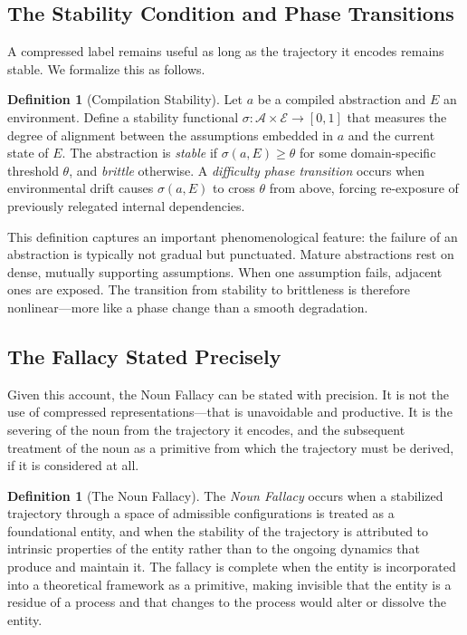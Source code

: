 \documentclass[12pt, a4paper]{article}
\theoremstyle{plain}
\theoremstyle{definition}
\newtheorem{definition}[theorem]{Definition}
\theoremstyle{remark}
\begin{document}
\subsection{The Stability Condition and Phase Transitions}

A compressed label remains useful as long as the trajectory it encodes
remains stable. We formalize this as follows.

\begin{definition}[Compilation Stability]
Let $a$ be a compiled abstraction and $E$ an environment. Define a stability
functional $\sigma: \mathcal{A} \times \mathcal{E} \to [0,1]$ that measures
the degree of alignment between the assumptions embedded in $a$ and the current
state of $E$. The abstraction is \emph{stable} if $\sigma(a,E) \geq \theta$
for some domain-specific threshold $\theta$, and \emph{brittle} otherwise.
A \emph{difficulty phase transition} occurs when environmental drift causes
$\sigma(a,E)$ to cross $\theta$ from above, forcing re-exposure of previously
relegated internal dependencies.
\end{definition}

This definition captures an important phenomenological feature: the failure
of an abstraction is typically not gradual but punctuated. Mature abstractions
rest on dense, mutually supporting assumptions. When one assumption fails,
adjacent ones are exposed. The transition from stability to brittleness is
therefore nonlinear---more like a phase change than a smooth degradation.

\subsection{The Fallacy Stated Precisely}

Given this account, the Noun Fallacy can be stated with precision. It is not
the use of compressed representations---that is unavoidable and productive.
It is the severing of the noun from the trajectory it encodes, and the
subsequent treatment of the noun as a primitive from which the trajectory
must be derived, if it is considered at all.

\begin{definition}[The Noun Fallacy]
The \emph{Noun Fallacy} occurs when a stabilized trajectory through a
space of admissible configurations is treated as a foundational entity,
and when the stability of the trajectory is attributed to intrinsic
properties of the entity rather than to the ongoing dynamics that produce
and maintain it. The fallacy is complete when the entity is incorporated
into a theoretical framework as a primitive, making invisible that the
entity is a residue of a process and that changes to the process would
alter or dissolve the entity.
\end{definition}
\end{document}
